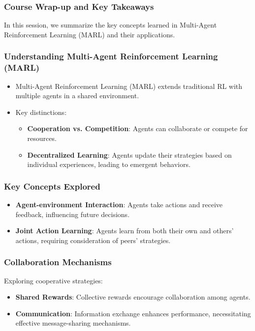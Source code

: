 \documentclass[aspectratio=169]{beamer}
\begin{document}
\begin{frame}
    \frametitle{Course Wrap-up and Key Takeaways}
    In this session, we summarize the key concepts learned in Multi-Agent Reinforcement Learning (MARL) and their applications.
\end{frame}

\begin{frame}
    \frametitle{Understanding Multi-Agent Reinforcement Learning (MARL)}
    \begin{itemize}
        \item Multi-Agent Reinforcement Learning (MARL) extends traditional RL with multiple agents in a shared environment.
        \item Key distinctions:
        \begin{itemize}
            \item \textbf{Cooperation vs. Competition}: Agents can collaborate or compete for resources.
            \item \textbf{Decentralized Learning}: Agents update their strategies based on individual experiences, leading to emergent behaviors.
        \end{itemize}
    \end{itemize}
\end{frame}

\begin{frame}
    \frametitle{Key Concepts Explored}
    \begin{itemize}
        \item \textbf{Agent-environment Interaction}: Agents take actions and receive feedback, influencing future decisions.
        \item \textbf{Joint Action Learning}: Agents learn from both their own and others' actions, requiring consideration of peers' strategies.
    \end{itemize}
\end{frame}

\begin{frame}
    \frametitle{Collaboration Mechanisms}
    Exploring cooperative strategies:
    \begin{itemize}
        \item \textbf{Shared Rewards}: Collective rewards encourage collaboration among agents.
        \item \textbf{Communication}: Information exchange enhances performance, necessitating effective message-sharing mechanisms.
    \end{itemize}
\end{frame}
\end{document}
